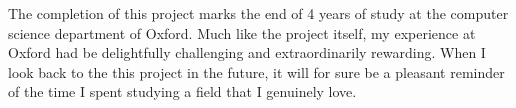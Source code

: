 The completion of this project marks the end of 4 years of study at the computer science department of Oxford. Much like the project itself, my experience at Oxford had be delightfully challenging and extraordinarily rewarding. When I look back to the this project in the future, it will for sure be a pleasant reminder of the time I spent studying a field that I genuinely love.